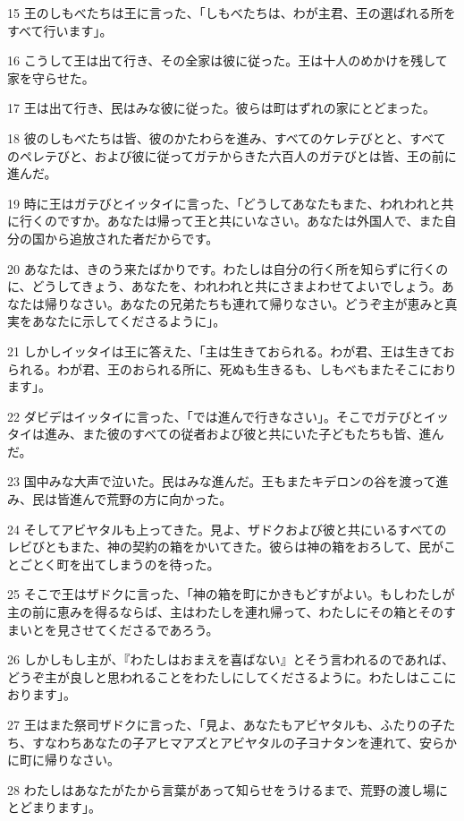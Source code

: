 \par 15 王のしもべたちは王に言った、「しもべたちは、わが主君、王の選ばれる所をすべて行います」。
\par 16 こうして王は出て行き、その全家は彼に従った。王は十人のめかけを残して家を守らせた。
\par 17 王は出て行き、民はみな彼に従った。彼らは町はずれの家にとどまった。
\par 18 彼のしもべたちは皆、彼のかたわらを進み、すべてのケレテびとと、すべてのペレテびと、および彼に従ってガテからきた六百人のガテびとは皆、王の前に進んだ。
\par 19 時に王はガテびとイッタイに言った、「どうしてあなたもまた、われわれと共に行くのですか。あなたは帰って王と共にいなさい。あなたは外国人で、また自分の国から追放された者だからです。
\par 20 あなたは、きのう来たばかりです。わたしは自分の行く所を知らずに行くのに、どうしてきょう、あなたを、われわれと共にさまよわせてよいでしょう。あなたは帰りなさい。あなたの兄弟たちも連れて帰りなさい。どうぞ主が恵みと真実をあなたに示してくださるように」。
\par 21 しかしイッタイは王に答えた、「主は生きておられる。わが君、王は生きておられる。わが君、王のおられる所に、死ぬも生きるも、しもべもまたそこにおります」。
\par 22 ダビデはイッタイに言った、「では進んで行きなさい」。そこでガテびとイッタイは進み、また彼のすべての従者および彼と共にいた子どもたちも皆、進んだ。
\par 23 国中みな大声で泣いた。民はみな進んだ。王もまたキデロンの谷を渡って進み、民は皆進んで荒野の方に向かった。
\par 24 そしてアビヤタルも上ってきた。見よ、ザドクおよび彼と共にいるすべてのレビびともまた、神の契約の箱をかいてきた。彼らは神の箱をおろして、民がことごとく町を出てしまうのを待った。
\par 25 そこで王はザドクに言った、「神の箱を町にかきもどすがよい。もしわたしが主の前に恵みを得るならば、主はわたしを連れ帰って、わたしにその箱とそのすまいとを見させてくださるであろう。
\par 26 しかしもし主が、『わたしはおまえを喜ばない』とそう言われるのであれば、どうぞ主が良しと思われることをわたしにしてくださるように。わたしはここにおります」。
\par 27 王はまた祭司ザドクに言った、「見よ、あなたもアビヤタルも、ふたりの子たち、すなわちあなたの子アヒマアズとアビヤタルの子ヨナタンを連れて、安らかに町に帰りなさい。
\par 28 わたしはあなたがたから言葉があって知らせをうけるまで、荒野の渡し場にとどまります」。
